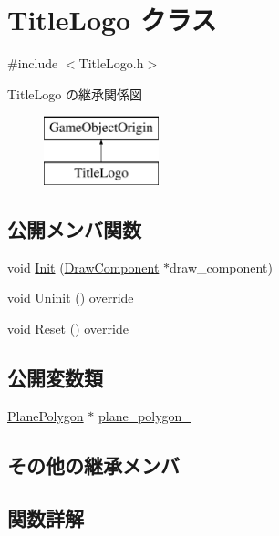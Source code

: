 \hypertarget{class_title_logo}{}\section{Title\+Logo クラス}
\label{class_title_logo}


{\ttfamily \#include $<$Title\+Logo.\+h$>$}

Title\+Logo の継承関係図\begin{figure}[H]
\begin{center}
\leavevmode
\includegraphics[height=2.000000cm]{class_title_logo}
\end{center}
\end{figure}
\subsection*{公開メンバ関数}
\begin{DoxyCompactItemize}
\item 
void \mbox{\hyperlink{class_title_logo_ac5b0a66a27d0e65ababfffd6c20f9b65}{Init}} (\mbox{\hyperlink{class_draw_component}{Draw\+Component}} $\ast$draw\+\_\+component)
\item 
void \mbox{\hyperlink{class_title_logo_a177943b3becc80fcdb7a34f131b07ee9}{Uninit}} () override
\item 
void \mbox{\hyperlink{class_title_logo_a8bca39d06592b95b26024c2d86ac349c}{Reset}} () override
\end{DoxyCompactItemize}
\subsection*{公開変数類}
\begin{DoxyCompactItemize}
\item 
\mbox{\hyperlink{class_plane_polygon}{Plane\+Polygon}} $\ast$ \mbox{\hyperlink{class_title_logo_a842ef60ff79632e1dad76599952eb95a}{plane\+\_\+polygon\+\_\+}}
\end{DoxyCompactItemize}
\subsection*{その他の継承メンバ}


\subsection{関数詳解}
\mbox{\label{class_title_logo_ac5b0a66a27d0e65ababfffd6c20f9b65}} 
